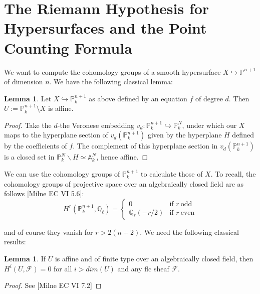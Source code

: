 \documentclass{ucbthesis}
\theoremstyle{definition}
\theoremstyle{theorem}
\newtheorem{lem}[thm]{Lemma}
\begin{document}
\section{The Riemann Hypothesis for Hypersurfaces and the Point Counting Formula}

We want to compute the cohomology groups of a smooth hypersurface $X \hookrightarrow \mathbb{P}^{n+1}$ of dimension $n$. We have the following classical lemma:
\begin{lem}
Let $X\hookrightarrow \mathbb{P}^{n+1}_{k}$ as above defined by an equation $f$ of degree $d$. Then $U:= \mathbb{P}^{n+1}_{k}\setminus X$ is affine.
\end{lem}
\begin{proof}
Take the $d$-the Veronese embedding $v_{d}:\mathbb{P}^{n+1}_{k} \hookrightarrow \mathbb{P}^{N}_{k}$, under which our $X$ maps to the hyperplane section of $v_{d}(\mathbb{P}^{n+1}_{k})$ given by the hyperplane $H$ defined by the coefficients of $f$. The complement of this hyperplane section in $v_{d}(\mathbb{P}^{n+1}_{k})$ is a closed set in $\mathbb{P}^{N}_{k}\backslash H \simeq \mathbb{A}_{k}^{N}$, hence affine. 
\end{proof}

We can use the cohomology groups of $\mathbb{P}^{n+1}_{k}$ to calculate those of $X$. To recall, the cohomology groups of projective space over an algebraically closed field are as follows [Milne EC VI 5.6]:
\[
 H^{r}(\mathbb{P}_{k}^{n+1},\mathbb{Q}_{\ell}) =
  \begin{cases}
   0 & \text{if } r\: \text{odd} \\
   \mathbb{Q}_{\ell}(-r/2)       & \text{if } r\:\text{even}
  \end{cases}
\]

and of course they vanish for $r>2(n+2)$. We need the following classical results:

\begin{lem}
If $U$ is affine and of finite type over an algebraically closed field, then $H^{i}(U,\mathcal{F}) = 0$ for all $i>dim(U)$ and any flc sheaf $\mathcal{F}$. 
\end{lem}
\begin{proof}
See [Milne EC VI 7.2]
\end{proof}
\end{document}

